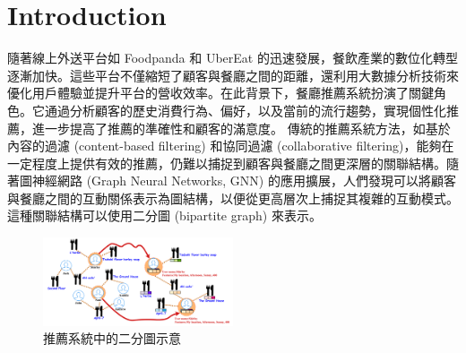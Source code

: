\section{Introduction}
\label{sec:intro}

隨著線上外送平台如 Foodpanda 和 UberEat 的迅速發展，餐飲產業的數位化轉型逐漸加快。這些平台不僅縮短了顧客與餐廳之間的距離，還利用大數據分析技術來優化用戶體驗並提升平台的營收效率。在此背景下，餐廳推薦系統扮演了關鍵角色。它通過分析顧客的歷史消費行為、偏好，以及當前的流行趨勢，實現個性化推薦，進一步提高了推薦的準確性和顧客的滿意度。\color{blue}
傳統的推薦系統方法，如基於內容的過濾 (content-based filtering) 和協同過濾 (collaborative filtering)，能夠在一定程度上提供有效的推薦，仍難以捕捉到顧客與餐廳之間更深層的關聯結構。隨著圖神經網路 (Graph Neural Networks, GNN) 的應用擴展，人們發現可以將顧客與餐廳之間的互動關係表示為圖結構，以便從更高層次上捕捉其複雜的互動模式。這種關聯結構可以使用二分圖 (bipartite graph) 來表示。

\begin{figure}[tbh]
    \centering
    \includegraphics[width=0.5\textwidth]{img/bipartite_graph.pdf}
    \caption{推薦系統中的二分圖示意~\cite{bipratite_fig}}
    \label{fig-bipartite}
    \vspace{-0.35cm}
\end{figure}

